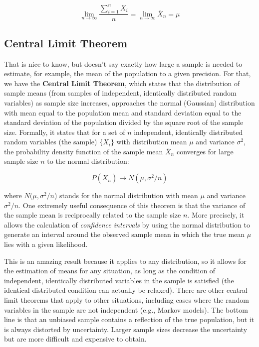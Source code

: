 \documentclass[
  letterpaper,
  DIV=11,
  numbers=noendperiod]{scrreprt}
\begin{document}
\[ 
\lim _{n \to \infty} \frac{\sum_{i=1}^n {X_i}}{n} = \lim _{n \to \infty} \overline{X}_n = \mu
\]

\subsection{Central Limit Theorem}\label{central-limit-theorem}

That is nice to know, but doesn't say exactly how large a sample is
needed to estimate, for example, the mean of the population to a given
precision. For that, we have the \textbf{Central Limit Theorem}, which
states that the distribution of sample means (from samples of
independent, identically distributed random variables) as sample size
increases, approaches the normal (Gaussian) distribution with mean equal
to the population mean and standard deviation equal to the standard
deviation of the population divided by the square root of the sample
size. Formally, it states that for a set of \(n\) independent,
identically distributed random variables (the sample) \(\{X_i\}\) with
distribution mean \(\mu\) and variance \(\sigma^2\), the probability
density function of the sample mean \(\overline{X}_n\) converges for
large sample size \(n\) to the normal distribution:

\[ 
P(\overline{X}_n) \to N(\mu, \sigma^2/n)
\]

where \(N(\mu, \sigma^2/n\)) stands for the normal distribution with
mean \(\mu\) and variance \(\sigma^2/n\). One extremely useful
consequence of this theorem is that the variance of the sample mean is
reciprocally related to the sample size \(n\). More precisely, it allows
the calculation of \emph{confidence intervals} by using the normal
distribution to generate an interval around the observed sample mean in
which the true mean \(\mu\) lies with a given likelihood.

This is an amazing result because it applies to any distribution, so it
allows for the estimation of means for any situation, as long as the
condition of independent, identically distributed variables in the
sample is satisfied (the identical distributed condition can actually be
relaxed). There are other central limit theorems that apply to other
situations, including cases where the random variables in the sample are
not independent (e.g., Markov models). The bottom line is that an
unbiased sample contains a reflection of the true population, but it is
always distorted by uncertainty. Larger sample sizes decrease the
uncertainty but are more difficult and expensive to obtain.
\end{document}
